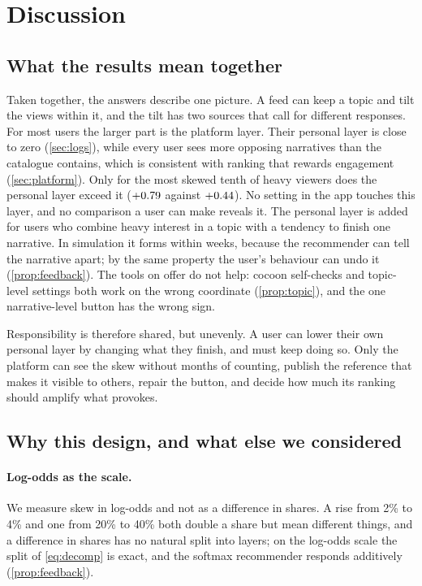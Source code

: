 \section{Discussion}
\label{sec:discussion}

\subsection{What the results mean together}

Taken together, the answers describe one picture. A feed can keep a topic and tilt the views within it, and the tilt has two sources that call for different responses. For most users the larger part is the platform layer. Their personal layer is close to zero (\cref{sec:logs}), while every user sees more opposing narratives than the catalogue contains, which is consistent with ranking that rewards engagement (\cref{sec:platform}). Only for the most skewed tenth of heavy viewers does the personal layer exceed it ($+0.79$ against $+0.44$). No setting in the app touches this layer, and no comparison a user can make reveals it. The personal layer is added for users who combine heavy interest in a topic with a tendency to finish one narrative. In simulation it forms within weeks, because the recommender can tell the narrative apart; by the same property the user's behaviour can undo it (\cref{prop:feedback}). The tools on offer do not help: cocoon self-checks and topic-level settings both work on the wrong coordinate (\cref{prop:topic}), and the one narrative-level button has the wrong sign.

Responsibility is therefore shared, but unevenly. A user can lower their own personal layer by changing what they finish, and must keep doing so. Only the platform can see the skew without months of counting, publish the reference that makes it visible to others, repair the button, and decide how much its ranking should amplify what provokes.

\subsection{Why this design, and what else we considered}

\paragraph{Log-odds as the scale.} We measure skew in log-odds and not as a difference in shares. A rise from 2\% to 4\% and one from 20\% to 40\% both double a share but mean different things, and a difference in shares has no natural split into layers; on the log-odds scale the split of \cref{eq:decomp} is exact, and the softmax recommender responds additively (\cref{prop:feedback}).

